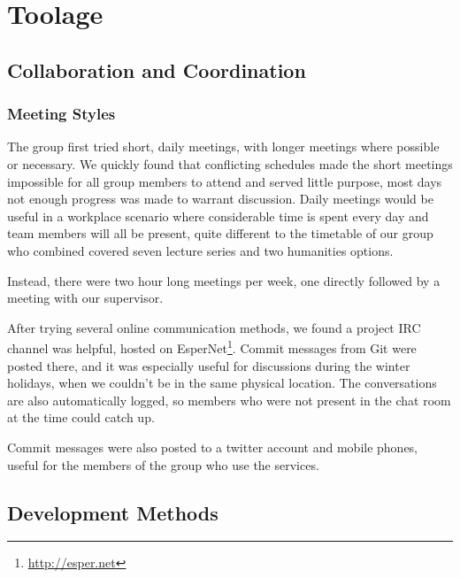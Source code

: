 \chapter{Toolage}

\section{Collaboration and Coordination}

  \subsection{Meeting Styles}
    The group first tried short, daily meetings, with longer meetings where possible or necessary.
    We quickly found that conflicting schedules made the short meetings impossible for all group members to attend and served little purpose, most days not enough progress was made to warrant discussion.
    Daily meetings would be useful in a workplace scenario where considerable time is spent every day and team members will all be present, quite different to the timetable of our group who combined covered seven lecture series and two humanities options.

    Instead, there were two hour long meetings per week, one directly followed by a meeting with our supervisor.

    After trying several online communication methods, we found a project IRC channel was helpful, hosted on EsperNet\footnote{\url{http://esper.net}}.
    Commit messages from Git were posted there, and it was especially useful for discussions during the winter holidays, when we couldn't be in the same physical location. The conversations are also automatically logged, so members who were not present in the chat room at the time could catch up.

    Commit messages were also posted to a twitter account and mobile phones, useful for the members of the group who use the services.

\section{Development Methods}


